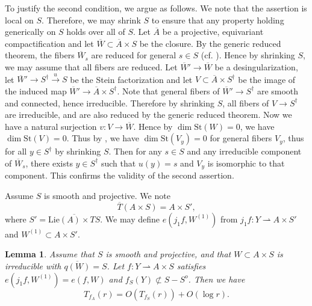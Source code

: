 \documentclass[11pt,english]{smfart}
\theoremstyle{plain}
\newtheorem{lem}[thm]{Lemma}
\theoremstyle{definition}
\theoremstyle{remark}
\numberwithin{equation}{section}
\theoremstyle{plain}
\newcommand{\da}{\rightharpoonup}
\begin{document}
	To justify the second condition, we argue as follows.
	We note that the assertion is local on $S$.
	Therefore, we may shrink $S$ to ensure that any property holding generically on $S$ holds over all of $S$.
	Let $\overline{A}$ be a projective, equivariant compactification and let $\overline{W}\subset \overline{A}\times S$ be the closure.
	By the generic reduced theorem, the fibers $\overline{W}_s$ are reduced for general $s\in S$ (cf. \cite[Tag 054Z, Tag 020I, Tag 0578]{stacks-project}).
Hence by shrinking $S$, we may assume that all fibers are reduced.
	Let $\overline{W}'\to\overline{W}$ be a desingularization, let $\overline{W}'\to S^{\dagger}\overset{u}{\to} S$ be the Stein factorization and let $V\subset \overline{A}\times S^{\dagger}$ be the image of the induced map $\overline{W}'\to \overline{A}\times S^{\dagger}$.
Note that general fibers of $\overline{W}'\to S^{\dagger}$ are smooth and connected, hence irreducible.
Therefore by shrinking $S$, all fibers of $V\to S^{\dagger}$ are irreducible, and are also reduced by the generic reduced theorem.
Now we have a natural surjection $v:V\to \overline{W}$.
Hence by $\dim \mathrm{St}(W)=0$, we have $\dim \mathrm{St}(V)=0$.
Thus by \cite[Lemma 11.12]{Y22}, we have $\dim \mathrm{St}(V_y)=0$ for general fibers $V_y$, thus for all $y\in S^{\dagger}$ by shrinking $S$.
Then for any $s\in S$ and any irreducible component of $\overline{W}_s$, there exists $y\in S^{\dagger}$ such that $u(y)=s$ and $V_y$ is isomorphic to that component.
This confirms the validity of the second assertion.
	
	Assume $S$ is smooth and projective.
	We note 
	\begin{equation}\label{eqn:20221203}
		\overline{T}(A\times S)=A\times S',
	\end{equation}
	where $S'=\overline{\mathrm{Lie}(A)\times TS}$.
	We may define $e(j_1f,W^{(1)})$ from $j_1f:Y\da A\times S'$ and $W^{(1)}\subset A\times S'$.
	
	
	
	
	
	
	
	
	\begin{lem}\label{lem:202210041}
		Assume that $S$ is smooth and projective, and that $W\subset A\times S$ is irreducible with $\overline{q(W)}=S$.
		Let $f:Y\da A\times S$ satisfies $e(j_1f,W^{(1)})=e(f,W)$ and $f_S(Y)\not\subset S- S^o$.
		Then we have
		$$T_{f_A}(r)=O(T_{f_S}(r))+O(\log r).$$
	\end{lem}
	
	
	
\end{document}
